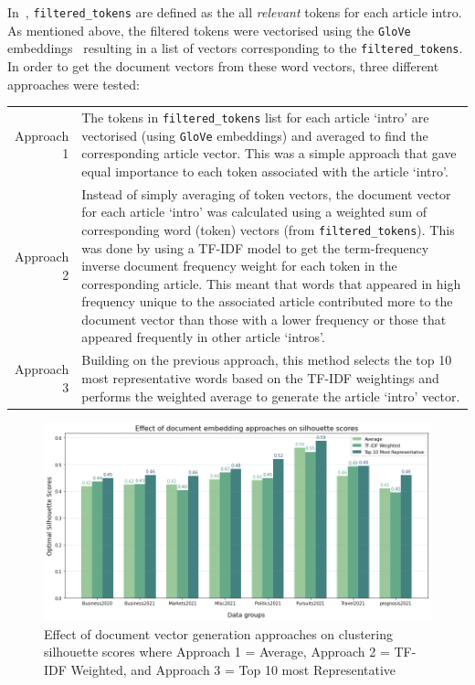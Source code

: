 In~, \texttt{filtered\_tokens} are defined as the all \textit{relevant} tokens for each article intro. As mentioned above, the filtered tokens were vectorised using the \texttt{GloVe} embeddings~\cite{glove} resulting in a list of vectors corresponding to the \texttt{filtered\_tokens}. In order to get the document vectors from these word vectors, three different approaches were tested: 

\renewcommand\arraystretch{2}
\captionsetup{singlelinecheck=false, labelfont=sc, labelsep=quad}
\begin{longtable}{@{\,}r <{\hskip 2pt} !{\foo} >{\arraybackslash}p{14cm}}
\centering

Approach 1 & The tokens in \texttt{filtered\_tokens} list for each article `intro' are vectorised (using \texttt{GloVe} embeddings) and averaged to find the corresponding article vector. This was a simple approach that gave equal importance to each token associated with the article `intro'. \\

Approach 2 & Instead of simply averaging of token vectors, the document vector for each article `intro' was calculated using a weighted sum of corresponding word (token) vectors (from \texttt{filtered\_tokens}). This was done by using a TF-IDF model to get the term-frequency inverse document frequency weight for each token in the corresponding article. This meant that words that appeared in high frequency unique to the associated article contributed more to the document vector than those with a lower frequency or those that appeared frequently in other article `intros'. \\

Approach 3 & Building on the previous approach, this method selects the top 10 most representative words based on the TF-IDF weightings and performs the weighted average to generate the article `intro' vector.\\
\end{longtable}
\vspace{-1ex}
\begin{figure}[H]
  \centering
  \includegraphics[width=0.9\linewidth]{images/eval/doc_embedding_sil.png}
  \caption{Effect of document vector generation approaches on clustering silhouette scores where Approach 1 = Average, Approach 2 = TF-IDF Weighted, and Approach 3 = Top 10 most Representative }
  \label{fig:doc_embeddings}
  \end{figure}

